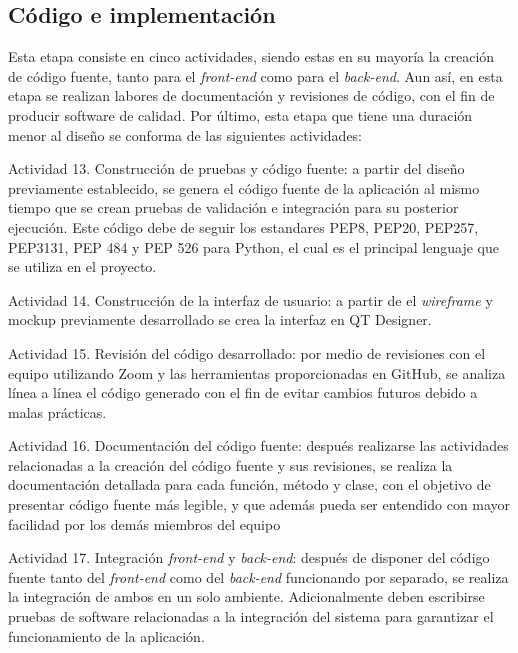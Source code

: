 \subsection{Código e implementación}
Esta etapa consiste en cinco actividades, siendo estas en su mayoría la creación de código fuente, tanto para el \textit{front-end} como para el \textit{back-end}. Aun así, en esta etapa se realizan labores de documentación y revisiones de código, con el fin de producir software de calidad. Por último, esta etapa que tiene una duración menor al diseño se conforma de las siguientes actividades:

\begin{APAitemize}
    \item Actividad 13. Construcción de pruebas y código fuente: a partir del diseño previamente establecido, se genera el código fuente de la aplicación al mismo tiempo que se crean pruebas de validación e integración para su posterior ejecución. Este código debe de seguir los estandares PEP8, PEP20, PEP257, PEP3131, PEP 484 y PEP 526 para Python, el cual es el principal lenguaje que se utiliza en el proyecto.
    \item Actividad 14. Construcción de la interfaz de usuario: a partir de el \textit{wireframe} y mockup previamente desarrollado se crea la interfaz en QT Designer.
    \item Actividad 15. Revisión del código desarrollado: por medio de revisiones con el equipo utilizando Zoom y las herramientas proporcionadas en GitHub, se analiza línea a línea el código generado con el fin de evitar cambios futuros debido a malas prácticas.
    \item Actividad 16. Documentación del código fuente: después realizarse las actividades relacionadas a la creación del código fuente y sus revisiones, se realiza la documentación detallada para cada función, método y clase, con el objetivo de presentar código fuente más legible, y que además pueda ser entendido con mayor facilidad por los demás miembros del equipo
    \item Actividad 17. Integración \textit{front-end} y \textit{back-end}: después de disponer del código fuente tanto del \textit{front-end} como del \textit{back-end} funcionando por separado, se realiza la integración de ambos en un solo ambiente. Adicionalmente deben escribirse pruebas de software relacionadas a la integración del sistema para garantizar el funcionamiento de la aplicación.
\end{APAitemize}

